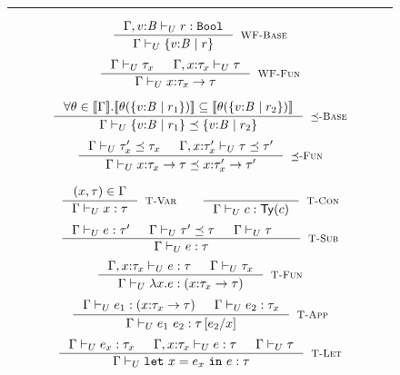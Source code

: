 \newcommand\restrictdecidable[2]{#2}
\begin{figure}[t!]
\hrule width 0.48\textwidth \vspace{0.05in}
$$
\inference
   {\undechastype{\Gamma, v \colon \Base}
                 {\restrictdecidable{p}{r}}{\tbool}
   }
   {\undeciswellformed{\Gamma}{\tref{v}{\Base}{}{\restrictdecidable{p}{r}}}}
   [\rwbase]
$$
$$
\inference{
	\undeciswellformed{\Gamma}{\tau_x} &&
	\undeciswellformed{\Gamma, x \colon \tau_x}{\tau}
}{
	\undeciswellformed{\Gamma}{\tfunref{x}{\tau_x}{\tau}{v}{e}}
}[\rwfun]
$$


$$
\inference{
  {\forall \sto\in \interp{\Env}. 
  		 \interp{\thetasub{\sto}{\tref{v}{\Base}{}{\restrictdecidable{p_1}{r_1}}}} 
  		\subseteq   \interp{\thetasub{\sto}{\tref{v}{\Base}{}{\restrictdecidable{p_2}{r_2}}}}}
}{
	\undecissubtype{\Gamma}
		{\tref{v}{\Base}{}{\restrictdecidable{p_1}{r_1}}}
		{\tref{v}{\Base}{}{\restrictdecidable{p_2}{r_2}}}
}[\rsubbase]
$$
$$
\inference{
	\undecissubtype{\Gamma}{\tau'_x}{\tau_x} &&
	\undecissubtype{\Gamma, x \colon \tau'_x}{\tau}{\tau'}
}{
	\undecissubtype{\Gamma}{\tfunref{x}{\tau_x}{\tau}{v}{e_1}}{\tfunref{x}{\tau'_x}{\tau'}{v}{e_2}}
}[\rsubfun]
$$

$$
\inference{
	(x,\tau) \in \Gamma 
}{
	\undechastype{\Gamma}{x}{\tau}
}[\rtvar]
\qquad
\inference{
}{
	\undechastype{\Gamma}{c}{\constty{c}}
}[\rtconst]
$$
$$
\inference{
	\undechastype{\Gamma}{e}{\tau'} &&
	\undecissubtype{\Gamma}{\tau'}{\tau} &&
	\undeciswellformed{\Gamma}{\tau} &&
}{
	\undechastype{\Gamma}{e}{\tau}
}[\rtsub]
$$
$$
\inference{
	\undechastype{\Gamma, x\colon\tau_x}{e}{\tau} &&
	\undeciswellformed{\Gamma}{\tau_x}
}{
	\undechastype{\Gamma}{\efun{x}{\tau_x}{e}}{(\tfun{x}{\tau_x}{\tau})}
}[\rtfun]
$$
$$
\inference{
	\undechastype{\Gamma}{e_1}{(\tfunref{x}{\tau_{x}}{\tau}{v}{e_v})} &&
	\undechastype{\Gamma}{\restrictdecidable{y}{e_2}}{\tau_{x}}
}{
	\undechastype{\Gamma}{\eapp{e_1}{\restrictdecidable{y}{e_2}}}{\tau\sub{x}{\restrictdecidable{y}{e_2}}}
}[\rtapp]
$$
$$
\inference{
	\undechastype{\Gamma}{e_x}{\tau_{x}} &&
	\undechastype{\Gamma,x\colon\tau_x}{e}{\tau} &&
	\undeciswellformed{\Gamma}{\tau}
}{
	\undechastype{\Gamma}{\elet{x}{e_x}{e}}{\tau}
}[\rtlet]
$$


\end{figure}

